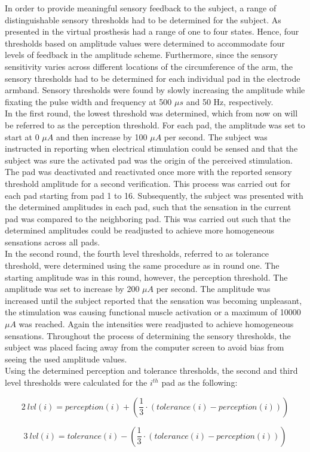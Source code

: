 In order to provide meaningful sensory feedback to the subject, a range of distinguishable sensory thresholds had to be determined for the subject. As presented in  the virtual prosthesis had a range of one to four states. Hence, four thresholds based on amplitude values were determined to accommodate four levels of feedback in the amplitude scheme. Furthermore, since the sensory sensitivity varies across different locations of the circumference of the arm, the sensory thresholds had to be determined for each individual pad in the electrode armband. Sensory thresholds were found by slowly increasing the amplitude while fixating the pulse width and frequency at 500 $\mu s $ and 50 Hz, respectively. \\
In the first round, the lowest threshold was determined, which from now on will be referred to as the perception threshold. For each pad, the amplitude was set to start at 0 $\mu A $ and then increase by 100 $\mu A $ per second. The subject was instructed in reporting when electrical stimulation could be sensed and that the subject was sure the activated pad was the origin of the perceived stimulation. The pad was deactivated and reactivated once more with the reported sensory threshold amplitude for a second verification. This process was carried out for each pad starting from pad 1 to 16. Subsequently, the subject was presented with the determined amplitudes in each pad, such that the sensation in the current pad was compared to the neighboring pad. This was carried out such that the determined amplitudes could be readjusted to achieve more homogeneous sensations across all pads.  \\
In the second round, the fourth level thresholds, referred to as tolerance threshold, were determined using the same procedure as in round one. The starting amplitude was in this round, however, the perception threshold. The amplitude was set to increase by 200 $\mu A $ per second. The amplitude was increased until the subject reported that the sensation was becoming unpleasant, the stimulation was causing functional muscle activation or a maximum of 10000 $\mu A $ was reached. Again the intensities were readjusted to achieve homogeneous sensations. Throughout the process of determining the sensory thresholds, the subject was placed facing away from the computer screen to avoid bias from seeing the used amplitude values.  \\ 
Using the determined perception and tolerance thresholds, the second and third level thresholds were calculated for the $i^{th}$ pad as the following:

\begin{equation}
2~lvl(i) = perception(i) + (\frac{1}{3} \cdot (tolerance(i) - perception(i)))
\end{equation}

\begin{equation}
3~lvl(i) = tolerance(i) - (\frac{1}{3} \cdot (tolerance(i) - perception(i)))
\end{equation}


       